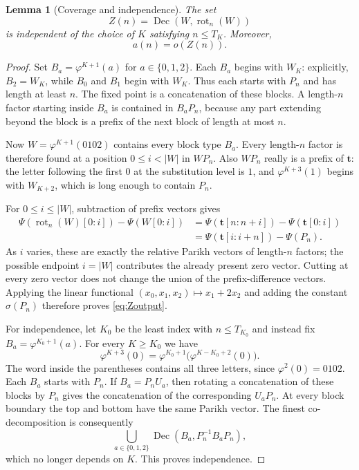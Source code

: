 \documentclass[11pt,a4paper]{article}
\newtheorem{lemma}[theorem]{Lemma}
\theoremstyle{definition}
\theoremstyle{remark}
\newcommand{\ttt}{\mathbf t}
\newcommand{\Dec}{\operatorname{Dec}}
\newcommand{\rot}{\operatorname{rot}}
\begin{document}
\begin{lemma}[Coverage and independence]\label{lem:coverage}
The set
\begin{equation}\label{eq:Zn}
 Z(n)=\Dec(W,\rot_n(W))
\end{equation}
is independent of the choice of $K$ satisfying $n\le T_K$. Moreover,
\begin{equation}\label{eq:Zoutput}
 a(n)=o(Z(n)).
\end{equation}
\end{lemma}
\begin{proof}
Set $B_a=\varphi^{K+1}(a)$ for $a\in\{0,1,2\}$. Each $B_a$ begins with
$W_K$: explicitly, $B_2=W_K$, while $B_0$ and $B_1$ begin with $W_K$.
Thus each starts with $P_n$ and has length at least $n$.
The fixed point is a concatenation of these blocks. A length-$n$ factor
starting inside $B_a$ is contained in $B_aP_n$, because any part extending
beyond the block is a prefix of the next block of length at most $n$.

Now $W=\varphi^{K+1}(0102)$ contains every block type $B_a$. Every
length-$n$ factor is therefore found at a position $0\le i<|W|$ in
$WP_n$. Also $WP_n$ really is a prefix of $\ttt$: the letter following the
first $0$ at the substitution level is $1$, and
$\varphi^{K+3}(1)$ begins with $W_{K+2}$, which is long enough to contain
$P_n$.

For $0\le i\le|W|$, subtraction of prefix vectors gives
\begin{align*}
 \Psi(\rot_n(W)[0:i])-\Psi(W[0:i])
 &=\Psi(\ttt[n:n+i])-\Psi(\ttt[0:i])\\
 &=\Psi(\ttt[i:i+n])-\Psi(P_n).
\end{align*}
As $i$ varies, these are exactly the relative Parikh vectors of length-$n$
factors; the possible endpoint $i=|W|$ contributes the already present zero
vector. Cutting at every zero vector does not change the union of the
prefix-difference vectors. Applying the linear functional
$(x_0,x_1,x_2)\mapsto x_1+2x_2$ and adding the constant $\sigma(P_n)$
therefore proves \eqref{eq:Zoutput}.

For independence, let $K_0$ be the least index with $n\le T_{K_0}$ and
instead fix $B_a=\varphi^{K_0+1}(a)$. For every $K\ge K_0$ we have
\[
 \varphi^{K+3}(0)
 =\varphi^{K_0+1}\bigl(\varphi^{K-K_0+2}(0)\bigr).
\]
The word inside the parentheses contains all three letters, since
$\varphi^2(0)=0102$. Each $B_a$ starts with $P_n$. If $B_a=P_nU_a$, then
rotating a concatenation of these blocks by $P_n$ gives the concatenation
of the corresponding $U_aP_n$. At every block boundary the top and bottom
have the same Parikh vector. The finest co-decomposition is consequently
\[
 \bigcup_{a\in\{0,1,2\}}\Dec(B_a,P_n^{-1}B_aP_n),
\]
which no longer depends on $K$. This proves independence.
\end{proof}
\end{document}
